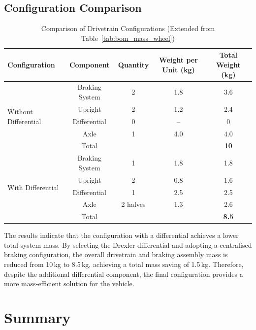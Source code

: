 \documentclass[11pt, a4paper]{report}
\numberwithin{equation}{section}
\begin{document}
\begin{refsection}
\subsection{Configuration Comparison}

\begin{table}[H]
\centering
\caption{Comparison of Drivetrain Configurations (Extended from Table~\ref{tab:bom_mass_wheel})}
\label{tab:drivetrain_comparison}
\begin{tabular}{lcccc}
\toprule
Configuration & Component & Quantity & Weight per Unit (kg) & Total Weight (kg) \\
\midrule
\multirow{5}{*}{Without Differential}
& Braking System & 2 & 1.8 & 3.6 \\
& Upright & 2 & 1.2 & 2.4 \\
& Differential & 0 & -- & 0 \\
& Axle & 1 & 4.0 & 4.0 \\
& Total & & & \textbf{10}\\
\midrule
\multirow{5}{*}{With Differential} 
& Braking System & 1 & 1.8 & 1.8 \\
& Upright & 2 & 0.8 & 1.6 \\
& Differential & 1 & 2.5 & 2.5 \\
& Axle & 2 halves & 1.3 & 2.6 \\
& Total & & & \textbf{8.5} \\
\bottomrule
\end{tabular}
\end{table}

The results indicate that the configuration with a differential achieves a lower total system mass. By selecting the Drexler differential and adopting a centralised braking configuration, the overall drivetrain and braking assembly mass is reduced from 10\,kg to 8.5\,kg, achieving a total mass saving of 1.5\,kg. Therefore, despite the additional differential component, the final configuration provides a more mass-efficient solution for the vehicle.


\section{Summary}%


\end{refsection}
\end{document}
